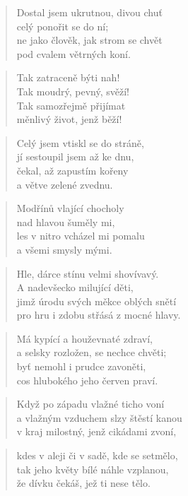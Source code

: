 \documentclass{book}
\begin{document}
\begin{verse}
Dostal jsem ukrutnou, divou chuť\\
celý ponořit se do ní;\\
ne jako člověk, jak strom se chvět\\
pod cvalem větrných koní.
\end{verse}
\begin{verse}
Tak zatraceně býti nah!\\
Tak moudrý, pevný, svěží!\\
Tak samozřejmě přijímat\\
měnlivý život, jenž běží!
\end{verse}
\begin{verse}
Celý jsem vtiskl se do stráně,\\
jí sestoupil jsem až ke dnu,\\
čekal, až zapustím kořeny\\
a větve zelené zvednu.
\end{verse}
\begin{verse}
Modřínů vlající chocholy\\
nad hlavou šuměly mi,\\
les v nitro vcházel mi pomalu\\
a všemi smysly mými.
\end{verse}
\newpage
{}
\begin{verse}
Hle, dárce stínu velmi shovívavý.\\
A nadevšecko milující děti,\\
jimž úrodu svých měkce oblých snětí\\
pro hru i zdobu střásá z mocné hlavy.
\end{verse}
\begin{verse}
Má kypící a houževnaté zdraví,\\
a selsky rozložen, se nechce chvěti;\\
byť nemohl i prudce zavoněti,\\
cos hlubokého jeho červen praví.
\end{verse}
\begin{verse}
Když po západu vlažné ticho voní\\
a vlažným vzduchem slzy štěstí kanou\\
v kraj milostný, jenž cikádami zvoní,
\end{verse}
\begin{verse}
kdes v aleji či v sadě, kde se setmělo,\\
tak jeho květy bílé náhle vzplanou,\\
že dívku čekáš, jež ti nese tělo.
\end{verse}
\end{document}
